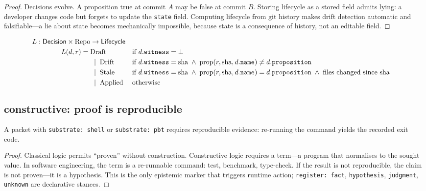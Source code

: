 \begin{proof}
Decisions evolve. A proposition true at commit $A$ may be false at commit
$B$. Storing lifecycle as a stored field admits lying: a developer
changes code but forgets to update the \texttt{state} field. Computing
lifecycle from git history makes drift detection automatic and
falsifiable---a lie about state becomes mechanically impossible,
because state is a consequence of history, not an editable field.
\end{proof}

\begin{theorem}
\begin{align*}
L : \mathsf{Decision} \times \mathrm{Repo} &\to \mathsf{Lifecycle} \\
L(d, r) = \;& \mathrm{Draft}   &&\text{if } d.\mathtt{witness} = \bot \\
           &\;\mid\; \mathrm{Drift} &&\text{if } d.\mathtt{witness} = \text{sha} \;\wedge\; \mathrm{prop}(r, \text{sha}, d.\mathtt{name}) \neq d.\mathtt{proposition} \\
           &\;\mid\; \mathrm{Stale} &&\text{if } d.\mathtt{witness} = \text{sha} \;\wedge\; \mathrm{prop}(r, \text{sha}, d.\mathtt{name}) = d.\mathtt{proposition} \;\wedge\; \text{files changed since sha} \\
           &\;\mid\; \mathrm{Applied} &&\text{otherwise}
\end{align*}
\end{theorem}

\subsection{constructive: proof is reproducible}

\begin{theorem}
A packet with \texttt{substrate: shell} or \texttt{substrate: pbt} requires
reproducible evidence: re-running the command yields the recorded
exit code.
\end{theorem}

\begin{proof}
Classical logic permits ``proven'' without construction. Constructive
logic requires a term---a program that normalises to the sought value.
In software engineering, the term is a re-runnable command: test,
benchmark, type-check. If the result is not reproducible, the claim is
not proven---it is a hypothesis. This is the only epistemic marker
that triggers runtime action; \texttt{register: fact}, \texttt{hypothesis},
\texttt{judgment}, \texttt{unknown} are declarative stances.
\end{proof}


